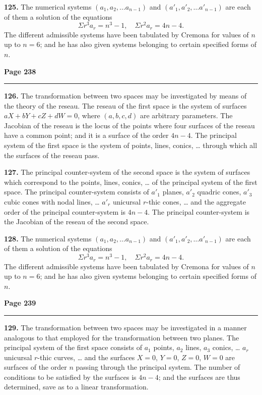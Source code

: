 \documentclass[12pt,a4paper]{article}
\theoremstyle{plain}
\theoremstyle{definition}
\theoremstyle{remark}
\begin{document}
\textbf{125.} The numerical systems $(a_1, a_2, \ldots a_{n-1})$ and $(a'_1, a'_2, \ldots a'_{n-1})$ are each of them a solution of the equations
\[
\Sigma r^3 a_r = n^3 - 1, \quad \Sigma r^2 a_r = 4n - 4.
\]
The different admissible systems have been tabulated by Cremona for values of $n$ up to $n = 6$; and he has also given systems belonging to certain specified forms of $n$.

\newpage
\noindent\textbf{Page 238}\\
\noindent\rule{\textwidth}{0.4pt}

\smallskip

\noindent\textbf{126.} The transformation between two spaces may be investigated by means of the theory of the reseau. The reseau of the first space is the system of surfaces $aX + bY + cZ + dW = 0$, where $(a, b, c, d)$ are arbitrary parameters. The Jacobian of the reseau is the locus of the points where four surfaces of the reseau have a common point; and it is a surface of the order $4n - 4$. The principal system of the first space is the system of points, lines, conics, \ldots{} through which all the surfaces of the reseau pass.

\textbf{127.} The principal counter-system of the second space is the system of surfaces which correspond to the points, lines, conics, \ldots{} of the principal system of the first space. The principal counter-system consists of $a'_1$ planes, $a'_2$ quadric cones, $a'_3$ cubic cones with nodal lines, \ldots{} $a'_r$ unicursal $r$-thic cones, \ldots{} and the aggregate order of the principal counter-system is $4n - 4$. The principal counter-system is the Jacobian of the reseau of the second space.

\textbf{128.} The numerical systems $(a_1, a_2, \ldots a_{n-1})$ and $(a'_1, a'_2, \ldots a'_{n-1})$ are each of them a solution of the equations
\[
\Sigma r^3 a_r = n^3 - 1, \quad \Sigma r^2 a_r = 4n - 4.
\]
The different admissible systems have been tabulated by Cremona for values of $n$ up to $n = 6$; and he has also given systems belonging to certain specified forms of $n$.

\newpage
\noindent\textbf{Page 239}\\
\noindent\rule{\textwidth}{0.4pt}

\smallskip

\noindent\textbf{129.} The transformation between two spaces may be investigated in a manner analogous to that employed for the transformation between two planes. The principal system of the first space consists of $a_1$ points, $a_2$ lines, $a_3$ conics, \ldots{} $a_r$ unicursal $r$-thic curves, \ldots{} and the surfaces $X = 0$, $Y = 0$, $Z = 0$, $W = 0$ are surfaces of the order $n$ passing through the principal system. The number of conditions to be satisfied by the surfaces is $4n - 4$; and the surfaces are thus determined, save as to a linear transformation.
\end{document}

